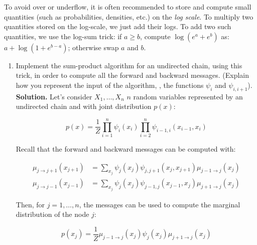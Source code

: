 \documentclass[a4paper, 11pt]{article}
\begin{document}
To avoid over or underflow, it is often recommended to store and compute small quantities (such as probabilities, densities, etc.) on the \emph{log scale}. To multiply two quantities stored on the log-scale, we just add their logs. To add two such quantities, we use the log-sum trick: if $a \geq b$, compute $\log \left( e^a + e^b \right)$ as: $a + \log \left( 1 + e^{b-a} \right)$; otherwise swap $a$ and $b$.

\begin{enumerate}
    \item Implement the sum-product algorithm for an undirected chain, using this trick, in order to compute all the forward and backward messages. (Explain how you represent the input of the algorithm, \ie, the functions $\psi_i$ and $\psi_{i, i+1}$). \\
    
    \textbf{Solution.} Let's consider $X_1, \dots, X_n$ $n$ random variables represented by an undirected chain and with joint distribution $p(x)$:

    \begin{equation*}
        p(x) = \frac{1}{Z} \prod_{i=1}^{n} \psi_i(x_i) \prod_{i=2}^{n} \psi_{i-1, i}(x_{i-1}, x_i)
    \end{equation*}
    
    Recall that the forward and backward messages can be computed with:
    
    \begin{equation*}
        \begin{aligned}
        \mu_{j \rightarrow j+1} \left( x_{j+1} \right) &= \sum_{x_j} \psi_j(x_j) \psi_{j, j+1} \left( x_j, x_{j+1} \right) \mu_{j-1 \rightarrow j} \left( x_j \right) \\
        \mu_{j \rightarrow j-1} \left( x_{j-1} \right) &= \sum_{x_j} \psi_j(x_j) \psi_{j-1, j} \left( x_{j-1}, x_j \right) \mu_{j+1 \rightarrow j} \left( x_j \right)
        \end{aligned}
    \end{equation*}
    
    Then, for $j = 1, \dots, n$, the messages can be used to compute the marginal distribution of the node $j$:
    
    \begin{equation*}
        p \left( x_j \right) = \frac{1}{Z} \mu_{j-1 \rightarrow j} \left( x_j \right) \psi_j \left( x_j \right) \mu_{j+1 \rightarrow j} \left( x_j \right)
    \end{equation*}
    

\end{enumerate}
\end{document}
